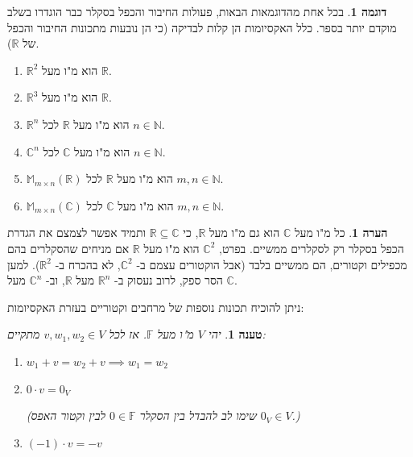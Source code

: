 \documentclass[12pt]{report}
\theoremstyle{plain}
\newtheorem{proposition}[theorem]{טענה}
\theoremstyle{definition}
\newtheorem{example}{דוגמה}[chapter]
\newtheorem{remark}{הערה}[chapter]
\newcommand{\R}{\mathbb{R}}
\newcommand{\N}{\mathbb{N}}
\newcommand{\C}{\mathbb{C}}
\newcommand{\F}{\mathbb{F}}
\newcommand{\M}{\mathbb{M}}
\newcommand{\0}{\mathbf{0}}
\begin{document}
\begin{example}
בכל אחת מהדוגמאות הבאות, פעולות החיבור והכפל בסקלר כבר הוגדרו בשלב מוקדם יותר בספר. כלל האקסיומות הן קלות לבדיקה (כי הן נובעות מתכונות החיבור והכפל של 
$\R$).

\begin{enumerate}[label=\alph*.]
\item 
$\R^2$
הוא מ"ו מעל
$\R$.


\item 
$\R^3$
הוא מ"ו מעל
$\R$.


\item 
$\R^n$
הוא מ"ו מעל
$\R$
לכל
$n\in\N$.


\item
$\C^n$
הוא מ"ו מעל
$\C$
לכל
$n\in\N$.


\item 
$\M_{m\times n}(\R)$
הוא מ"ו מעל 
$\R$
לכל
$m,n\in\N$.


\item 
$\M_{m\times n}(\C)$
הוא מ"ו מעל
$\C$
לכל
$m,n\in\N$.


\end{enumerate}
\end{example}

\begin{remark}
כל מ"ו מעל
$\C$
הוא גם מ"ו מעל
$\R$,
כי
$\R\subseteq\C$
ותמיד אפשר לצמצם את הגדרת הכפל בסקלר רק לסקלרים ממשיים. בפרט,
$\C^2$
הוא מ"ו מעל 
$\R$
אם מניחים שהסקלרים בהם מכפילים וקטורים, הם ממשיים בלבד (אבל הוקטורים עצמם ב-
$\C^2$,
לא בהכרח ב-
$\R^2$).
למען הסר ספק, לרוב נעסוק ב-
$\R^n$
מעל
$\R$,
וב-
$\C^n$
מעל
$\C$.
\end{remark}

ניתן להוכיח תכונות נוספות של מרחבים וקטוריים בעזרת האקסיומות:

\begin{proposition}\label{prop:vector-properties}
יהי
$V$
מ"ו מעל
$\F$.
אז לכל 
$v,w_1,w_2\in V$
מתקיים:
\begin{enumerate}[label=\alph*.]
\item 
$
w_1+v=w_2+v \implies w_1=w_2
$


\item 
$0\cdot v=0_V$

(שימו לב להבדל בין הסקלר
$0\in\F$
לבין וקטור האפס 
$0_V\in V$.)


\item 
$(-1)\cdot v=-v$


\end{enumerate}
\end{proposition}
\end{document}
